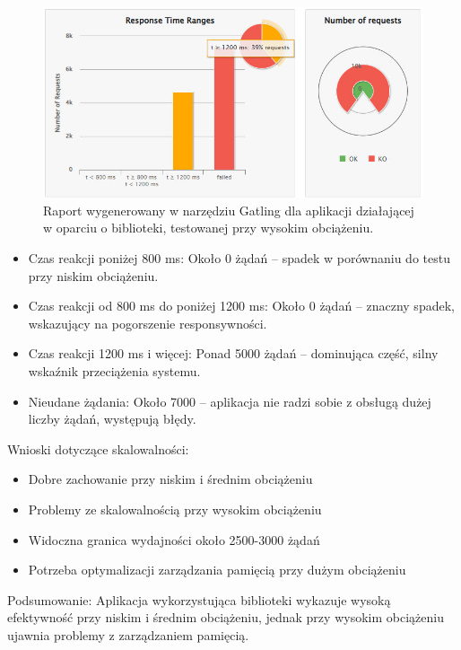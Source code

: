 \documentclass[runningheads,12pt]{llncs}
\begin{document}
\begin{figure}
    \centering
    \includegraphics[width=0.8\linewidth]{images/library-gatling-high-graph.jpg}
    \caption{Raport wygenerowany w narzędziu Gatling dla aplikacji działającej w oparciu o biblioteki, testowanej przy wysokim obciążeniu.}
    \label{fig:high}
\end{figure}

\begin{itemize}
    \item Czas reakcji poniżej 800 ms: Około 0 żądań – spadek w porównaniu do testu przy niskim obciążeniu.
    \item Czas reakcji od 800 ms do poniżej 1200 ms: Około 0 żądań – znaczny spadek, wskazujący na pogorszenie responsywności.
    \item Czas reakcji 1200 ms i więcej: Ponad 5000 żądań – dominująca część, silny wskaźnik przeciążenia systemu.
    \item Nieudane żądania: Około 7000 – aplikacja nie radzi sobie z obsługą dużej liczby żądań, występują błędy.
\end{itemize}

Wnioski dotyczące skalowalności: 
\begin{itemize} 
    \item Dobre zachowanie przy niskim i średnim obciążeniu 
    \item Problemy ze skalowalnością przy wysokim obciążeniu 
    \item Widoczna granica wydajności około 2500-3000 żądań 
    \item Potrzeba optymalizacji zarządzania pamięcią przy dużym obciążeniu 
\end{itemize}

Podsumowanie: Aplikacja wykorzystująca biblioteki wykazuje wysoką efektywność przy niskim i średnim obciążeniu, jednak przy wysokim obciążeniu ujawnia problemy z zarządzaniem pamięcią.

\newpage

\end{document}
